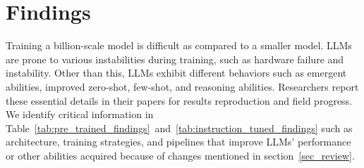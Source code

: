 \section{Findings}
\label{sec:Findings}
Training a billion-scale model is difficult as compared to a smaller model. LLMs are prone to various instabilities during training, such as hardware failure and instability. Other than this, LLMs exhibit different behaviors such as emergent abilities, improved zero-shot, few-shot, and reasoning abilities. Researchers report these essential details in their papers for results reproduction and field progress. We identify critical information in Table~\ref{tab:pre_trained_findings}~and~\ref{tab:instruction_tuned_findings} such as architecture, training strategies, and pipelines that improve LLMs' performance or other abilities acquired because of changes mentioned in section~\ref{sec_review}.  